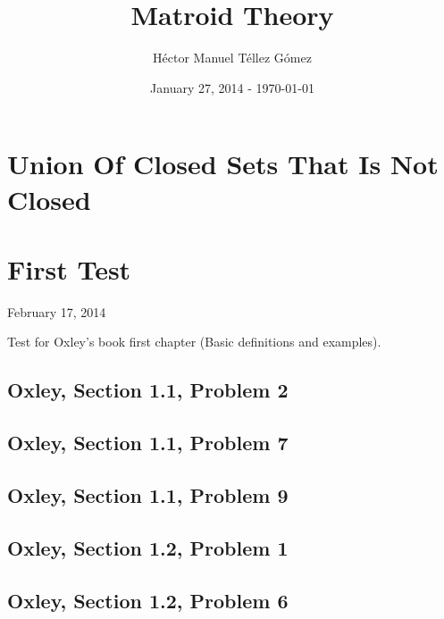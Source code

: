\frontmatter
\title{Matroid Theory}
\author{Héctor Manuel Téllez Gómez}
\date{January 27, 2014 - \today}
\maketitle

\tableofcontents

\mainmatter


\chapter{Union Of Closed Sets That Is Not Closed}


\chapter{First Test}
    \begin{center} February 17, 2014 \end{center}
    Test for Oxley's book first chapter (Basic definitions and examples). 
    
    \section{Oxley, Section 1.1, Problem 2}
        
        \clearpage

    \section{Oxley, Section 1.1, Problem 7}
        
        \clearpage
    \section{Oxley, Section 1.1, Problem 9}
        
        \clearpage

    \section{Oxley, Section 1.2, Problem 1}
        
        \clearpage

    \section{Oxley, Section 1.2, Problem 6}
        
        \clearpage

